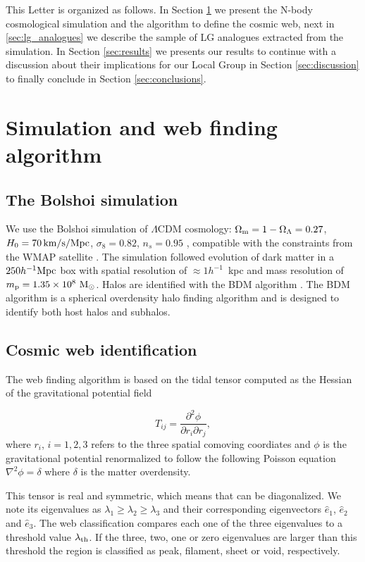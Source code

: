 \documentclass{emulateapj}
\newcommand{\hmpc}{{\ifmmode{h^{-1}{\rm Mpc}}\else{$h^{-1}$Mpc }\fi}}
\begin{document}
This Letter is organized as follows. In Section \ref{sec:simulation}
we present the N-body cosmological simulation and the algorithm to
define the cosmic web, next in \ref{sec:lg_analogues} we describe the
sample of LG analogues extracted from the simulation. In
Section \ref{sec:results} we presents our results to continue with a
discussion about their implications for our Local Group in Section
\ref{sec:discussion} to finally conclude in Section
\ref{sec:conclusions}. 


\section{Simulation and web finding algorithm}
\label{sec:simulation}

\subsection{The Bolshoi simulation}
We use the Bolshoi simulation of $\Lambda$CDM cosmology: $\Omega_{\rm
  m}=1-\Omega_{\Lambda}=0.27$, $H_0=70\,\rm km/s/Mpc$,
$\sigma_8=0.82$, $n_s=0.95$ \citep{2011ApJ...740..102K}, compatible
with the constraints from the WMAP satellite
\citep{hinshaw_etal13}. The simulation followed evolution of dark
matter in a $250 \hmpc$ box with spatial resolution of $\approx
1h^{-1}$~kpc and mass resolution of $m_{\rm p}=1.35\times 10^8\ \rm
M_{\odot}$. Halos are identified with the BDM algorithm
\citep{1997astro.ph.12217K}. The BDM algorithm is  a spherical
overdensity halo finding algorithm and is designed to identify both
host halos and subhalos. 


\subsection{Cosmic web identification}
The web finding algorithm is based on the tidal tensor computed as the
Hessian of the  gravitational potential field

\begin{equation}
T_{ij} = \frac{\partial^2 \phi}{\partial r_i \partial r_j}, 
\end{equation}
%
where $r_{i}$, $i=1,2,3$ refers to the three spatial comoving
coordiates and $\phi$ is the gravitational potential renormalized to
follow the following Poisson equation $\nabla^2\phi=\delta$ where
$\delta$ is the matter overdensity.  

This tensor is real and symmetric, which means that can be
diagonalized. We note its eigenvalues as $\lambda_1\geq \lambda_2\geq
\lambda_3$ and their corresponding eigenvectors $\hat{e}_1$,
$\hat{e}_2$ and $\hat{e}_3$. The web classification compares each one
of the three eigenvalues to a threshold value $\lambda_{\rm th}$. If
the three, two, one or zero eigenvalues are larger than this threshold
the region is classified as peak, filament, sheet or void,
respectively.  
\end{document}
